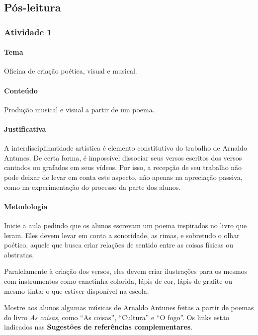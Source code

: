 \documentclass[11pt]{extarticle}
\begin{document}
\subsection{Pós-leitura}

\subsubsection{Atividade 1}


\paragraph{Tema} Oficina de criação poética, visual e musical.

\paragraph{Conteúdo} Produção musical e visual a partir de um poema.

\paragraph{Justificativa} A interdisciplinaridade artística é elemento
constitutivo do trabalho de Arnaldo Antunes. De certa forma, 
é impossível dissociar seus versos escritos dos versos cantados
ou grafados em seus vídeos. Por isso, a recepção de seu trabalho
não pode deixar de levar em conta este aspecto, não apenas
na apreciação passiva, como na experimentação do processo
da parte dos alunos. 

\paragraph{Metodologia} Inicie a aula pedindo que os alunos
escrevam um poema inspirados no livro que leram.
Eles devem levar em conta a sonoridade, as rimas, e sobretudo
o olhar poético, aquele que busca criar relações de sentido
entre as coisas físicas ou abstratas. 

Paralelamente à criação dos versos, eles devem criar ilustrações para 
os mesmos com instrumentos como canetinha colorida, lápis de cor,
lápis de grafite ou mesmo tinta; o que estiver disponível na escola. 

Mostre aos alunos algumas músicas de Arnaldo Antunes feitas a partir de
poemas do livro \textit{As coisas}, como ``As coisas'', ``Cultura'' e
``O fogo''. Os links estão indicados nas \textbf{Sugestões de referências complementares}.
\end{document}
